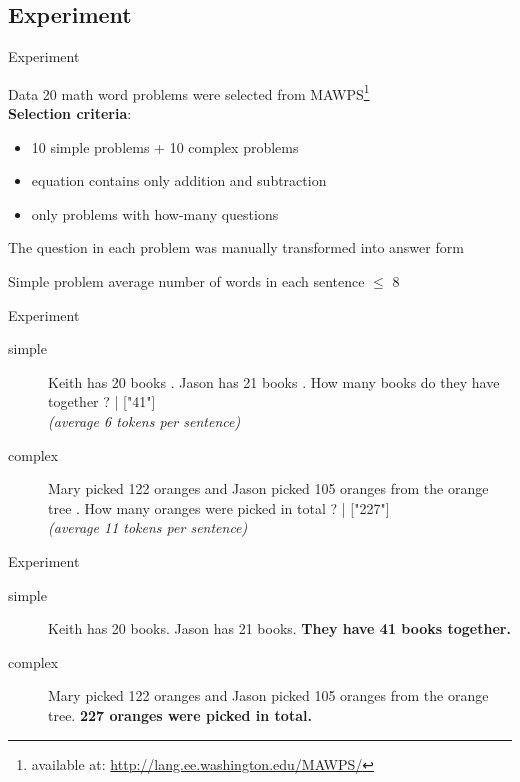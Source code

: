\documentclass[11pt]{beamer}
\begin{document}
\subsection{Experiment}
\begin{frame}{Experiment}
    \begin{block}{Data}
    20 math word problems were selected from MAWPS\footnote[frame, 1]{available at: \href{http://lang.ee.washington.edu/MAWPS/}{http://lang.ee.washington.edu/MAWPS/}}\\
    \textbf{Selection criteria}:
    \begin{itemize}
    \item 10 simple problems + 10 complex problems
    \item equation contains only addition and subtraction
    \item only problems with how-many questions
    \end{itemize}
    The question in each problem was manually transformed into answer form
    \end{block}
    \begin{block}{Simple problem}
    average number of words in each sentence $\leq$ 8
    \end{block}
\end{frame}

\begin{frame}{Experiment}
    \begin{example}
    \begin{description}
        \item[simple] Keith has 20 books . Jason has 21 books . How many books do they have together ?  | ["41"]\\
        \textsl{(average 6 tokens per sentence)}
        \item[complex] Mary picked 122 oranges and Jason picked 105 oranges from the orange tree . How many oranges were picked in total ?  | ["227"]\\
        \textsl{(average 11 tokens per sentence)}
    \end{description}
    \end{example}
\end{frame}

\begin{frame}{Experiment}
    \begin{example}
    \begin{description}
        \item[simple] Keith has 20 books. Jason has 21 books. \textbf{They have 41 books together.}
        \item[complex] Mary picked 122 oranges and Jason picked 105 oranges from the orange tree. \textbf{227 oranges were picked in total.}
    \end{description}
    \end{example}
\end{frame}
\end{document}
